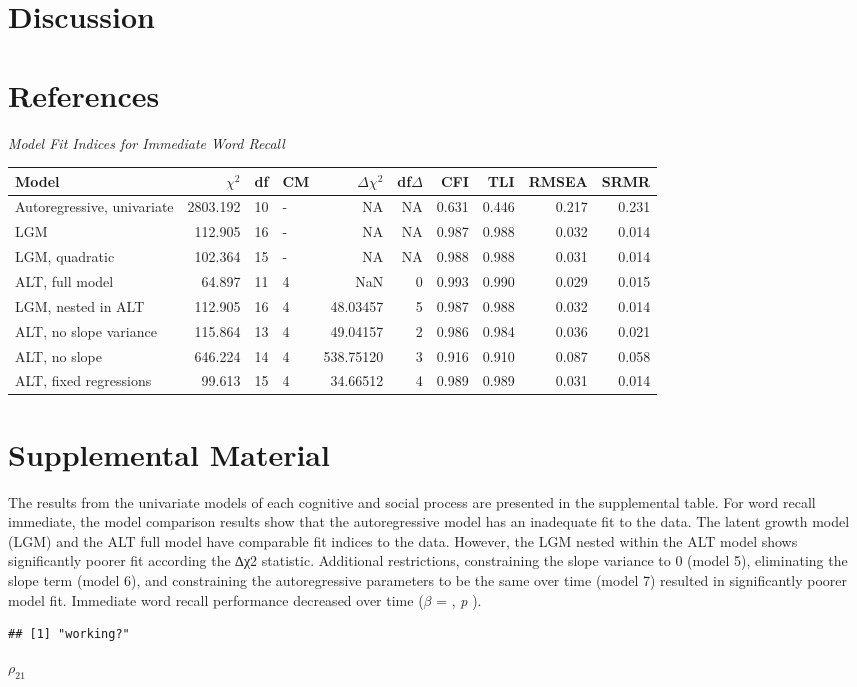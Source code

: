 \documentclass[english,man]{apa6}
\theoremstyle{definition}
\theoremstyle{definition}
\theoremstyle{remark}
\begin{document}
\section{Discussion}\label{discussion}

\newpage

\section{References}\label{references}

\setlength{\parindent}{-0.5in} \setlength{\leftskip}{0.5in}

\newpage

\label{tab:immediate-word-recall-model-summaries}\emph{Model Fit Indices for
Immediate Word Recall}

\begin{longtable}[]{@{}lrrlrrrrrr@{}}
\toprule
Model & \(\chi^2\) & df & CM & \(\Delta\chi^2\) & df\(\Delta\) & CFI &
TLI & RMSEA & SRMR\tabularnewline
\midrule
\endhead
Autoregressive, univariate & 2803.192 & 10 & - & NA & NA & 0.631 & 0.446
& 0.217 & 0.231\tabularnewline
LGM & 112.905 & 16 & - & NA & NA & 0.987 & 0.988 & 0.032 &
0.014\tabularnewline
LGM, quadratic & 102.364 & 15 & - & NA & NA & 0.988 & 0.988 & 0.031 &
0.014\tabularnewline
ALT, full model & 64.897 & 11 & 4 & NaN & 0 & 0.993 & 0.990 & 0.029 &
0.015\tabularnewline
LGM, nested in ALT & 112.905 & 16 & 4 & 48.03457 & 5 & 0.987 & 0.988 &
0.032 & 0.014\tabularnewline
ALT, no slope variance & 115.864 & 13 & 4 & 49.04157 & 2 & 0.986 & 0.984
& 0.036 & 0.021\tabularnewline
ALT, no slope & 646.224 & 14 & 4 & 538.75120 & 3 & 0.916 & 0.910 & 0.087
& 0.058\tabularnewline
ALT, fixed regressions & 99.613 & 15 & 4 & 34.66512 & 4 & 0.989 & 0.989
& 0.031 & 0.014\tabularnewline
\bottomrule
\end{longtable}

\section{Supplemental Material}\label{supplemental-material}

The results from the univariate models of each cognitive and social
process are presented in the supplemental table. For word recall
immediate, the model comparison results show that the autoregressive
model has an inadequate fit to the data. The latent growth model (LGM)
and the ALT full model have comparable fit indices to the data. However,
the LGM nested within the ALT model shows significantly poorer fit
according the ∆χ2 statistic. Additional restrictions, constraining the
slope variance to 0 (model 5), eliminating the slope term (model 6), and
constraining the autoregressive parameters to be the same over time
(model 7) resulted in significantly poorer model fit. Immediate word
recall performance decreased over time (\(\beta\) = , \emph{p} ).

\begin{verbatim}
## [1] "working?"
\end{verbatim}

\(\rho_{21}\)
\end{document}

